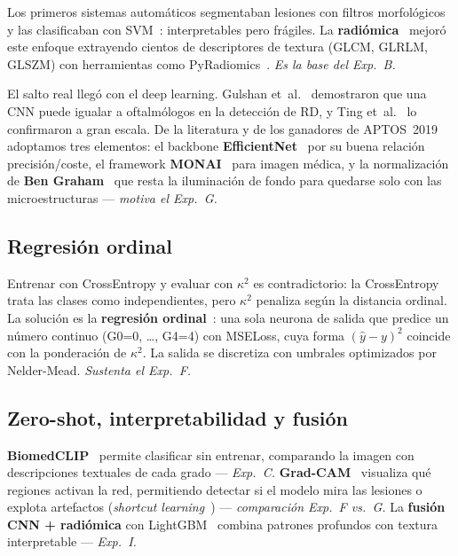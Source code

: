 \documentclass[12pt, a4paper]{article}
\begin{document}
Los primeros sistemas automáticos segmentaban lesiones con filtros
morfológicos y las clasificaban con SVM~\cite{abramoff2010}: interpretables
pero frágiles. La \textbf{radiómica}~\cite{gillies2016radiomics} mejoró
este enfoque extrayendo cientos de descriptores de textura (GLCM, GLRLM,
GLSZM) con herramientas como PyRadiomics~\cite{vangriethuysen2017}.
\textit{Es la base del Exp.~B.}

El salto real llegó con el deep learning. Gulshan
et~al.~\cite{gulshan2016} demostraron que una CNN puede igualar a
oftalmólogos en la detección de RD, y Ting et~al.~\cite{ting2017} lo
confirmaron a gran escala. De la literatura y de los ganadores de
APTOS~2019 adoptamos tres elementos: el backbone
\textbf{EfficientNet}~\cite{tan2019efficientnet} por su buena relación
precisión/coste, el framework \textbf{MONAI}~\cite{cardoso2022monai}
para imagen médica, y la normalización de
\textbf{Ben Graham}~\cite{graham2015} que resta la iluminación de fondo
para quedarse solo con las microestructuras --- \textit{motiva el Exp.~G.}

\subsection{Regresión ordinal}

Entrenar con CrossEntropy y evaluar con $\kappa^2$ es contradictorio:
la CrossEntropy trata las clases como independientes, pero $\kappa^2$
penaliza según la distancia ordinal. La solución es la \textbf{regresión
ordinal}~\cite{beckham2017ordinal,cao2020rank}: una sola neurona de
salida que predice un número continuo (G0=0, \ldots, G4=4) con MSELoss,
cuya forma $(\hat{y}-y)^2$ coincide con la ponderación de $\kappa^2$.
La salida se discretiza con umbrales optimizados por Nelder-Mead.
\textit{Sustenta el Exp.~F.}

\subsection{Zero-shot, interpretabilidad y fusión}

\textbf{BiomedCLIP}~\cite{zhang2023biomedclip} permite clasificar sin
entrenar, comparando la imagen con descripciones textuales de cada grado
--- \textit{Exp.~C.}
\textbf{Grad-CAM}~\cite{selvaraju2017gradcam} visualiza qué regiones
activan la red, permitiendo detectar si el modelo mira las lesiones o
explota artefactos (\textit{shortcut
learning}~\cite{geirhos2020shortcut}) --- \textit{comparación Exp.~F
vs.~G.}
La \textbf{fusión CNN + radiómica} con
LightGBM~\cite{ke2017lightgbm} combina patrones profundos con textura
interpretable --- \textit{Exp.~I.}
\end{document}
